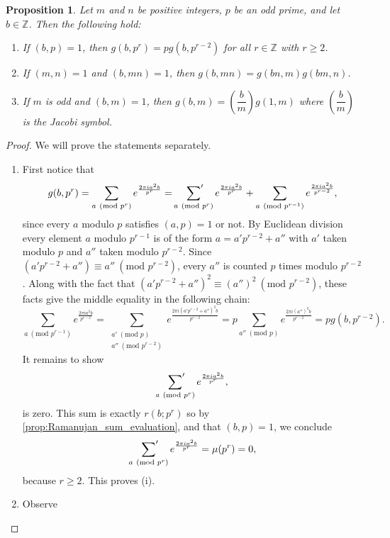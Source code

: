 \documentclass[12pt]{book}
\newtheorem{proposition}{Proposition}[section]
\theoremstyle{definition}\newframedtheorem{method}{Method}
\newcommand{\psum}{\sideset{}{'}\sum}
\newcommand{\legendre}[2]{\genfrac{(}{)}{0.5pt}{0}{#1}{#2}}
\newcommand{\tmod}[1]{\ \left(\text{mod }#1\right)}
\newcommand{\Z}{\mathbb{Z}}
\newcommand{\<}{\langle}
\renewcommand{\>}{\rangle}
\begin{document}
      \begin{proposition}\label{prop:quadratic_Gauss_sum_reduction}
        Let $m$ and $n$ be positive integers, $p$ be an odd prime, and let $b \in \Z$. Then the following hold:
        \begin{enumerate}[label=(\roman*)]
          \item If $(b,p) = 1$, then $g(b,p^{r}) = pg(b,p^{r-2})$ for all $r \in \Z$ with $r \ge 2$.
          \item If $(m,n) = 1$ and $(b,mn) = 1$, then $g(b,mn) = g(bn,m)g(bm,n)$.
          \item If $m$ is odd and $(b,m) = 1$, then $g(b,m) = \legendre{b}{m}g(1,m)$ where $\legendre{b}{m}$ is the Jacobi symbol.
        \end{enumerate}
      \end{proposition}
      \begin{proof}
        We will prove the statements separately.
        \begin{enumerate}[label=(\roman*)]
          \item First notice that
          \[
            g(b,p^{r}) = \sum_{a \tmod{p^{r}}}e^{\frac{2\pi ia^{2}b}{p^{r}}} = \psum_{a \tmod{p^{r}}}e^{\frac{2\pi ia^{2}b}{p^{r}}}+\sum_{a \tmod{p^{r-1}}}e^{\frac{2\pi ia^{2}b}{p^{r-2}}},
          \]
          since every $a$ modulo $p$ satisfies $(a,p) = 1$ or not. By Euclidean division every element $a$ modulo $p^{r-1}$ is of the form $a = a'p^{r-2}+a''$ with $a'$ taken modulo $p$ and $a''$ taken modulo $p^{r-2}$. Since $(a'p^{r-2}+a'') \equiv a'' \tmod{p^{r-2}}$, every $a''$ is counted $p$ times modulo $p^{r-2}$. Along with the fact that $(a'p^{r-2}+a'')^{2} \equiv (a'')^{2} \tmod{p^{r-2}}$, these facts give the middle equality in the following chain:
          \[
            \sum_{a \tmod{p^{r-1}}}e^{\frac{2\pi ia^{2}b}{p^{r-2}}} = \sum_{\substack{a' \tmod{p} \\ a'' \tmod{p^{r-2}}}}e^{\frac{2\pi i\left(a'p^{r-2}+a''\right)^{2}b}{p^{r-2}}} = p\sum_{a'' \tmod{p}}e^{\frac{2\pi i(a'')^{2}b}{p^{r-2}}} = pg(b,p^{r-2}).
          \]
          It remains to show
          \[
            \psum_{a \tmod{p^{r}}}e^{\frac{2\pi ia^{2}b}{p^{r}}},
          \]
          is zero. This sum is exactly $r(b;p^{r})$ so by \cref{prop:Ramanujan_sum_evaluation}, and that $(b,p) = 1$, we conclude
          \[
            \psum_{a \tmod{p^{r}}}e^{\frac{2\pi ia^{2}b}{p^{r}}} = \mu(p^{r}) = 0,
          \]
          because $r \ge 2$. This proves (i).
          \item Observe

\end{enumerate}
\end{proof}
\end{document}
